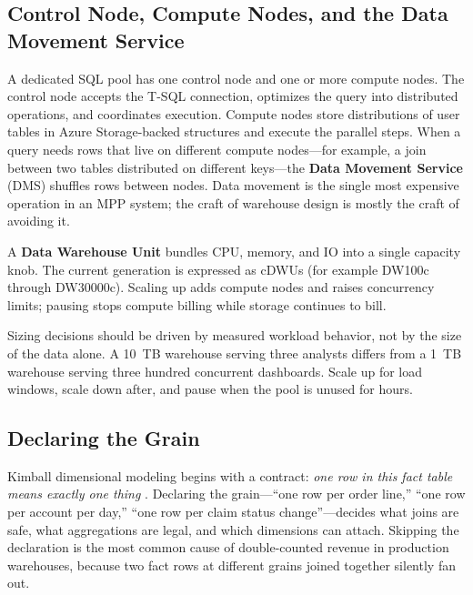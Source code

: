 \subsection{Control Node, Compute Nodes, and the Data Movement Service}
A dedicated SQL pool has one control node and one or more compute nodes. The control node accepts the T-SQL connection, optimizes the query into distributed operations, and coordinates execution. Compute nodes store distributions of user tables in Azure Storage-backed structures and execute the parallel steps. When a query needs rows that live on different compute nodes---for example, a join between two tables distributed on different keys---the \textbf{Data Movement Service} (DMS) shuffles rows between nodes. Data movement is the single most expensive operation in an MPP system; the craft of warehouse design is mostly the craft of avoiding it.

\begin{definitionbox}
A \textbf{Data Warehouse Unit} bundles CPU, memory, and IO into a single capacity knob. The current generation is expressed as cDWUs (for example DW100c through DW30000c). Scaling up adds compute nodes and raises concurrency limits; pausing stops compute billing while storage continues to bill.
\end{definitionbox}

Sizing decisions should be driven by measured workload behavior, not by the size of the data alone. A 10~TB warehouse serving three analysts differs from a 1~TB warehouse serving three hundred concurrent dashboards. Scale up for load windows, scale down after, and pause when the pool is unused for hours.

\subsection{Declaring the Grain}
Kimball dimensional modeling begins with a contract: \emph{one row in this fact table means exactly one thing} \cite{kimball2013dwtk}. Declaring the grain---``one row per order line,'' ``one row per account per day,'' ``one row per claim status change''---decides what joins are safe, what aggregations are legal, and which dimensions can attach. Skipping the declaration is the most common cause of double-counted revenue in production warehouses, because two fact rows at different grains joined together silently fan out.

